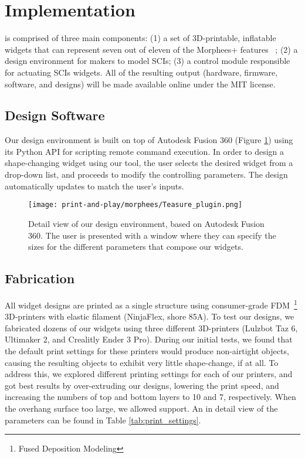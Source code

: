   \section{Implementation}
    \mp is comprised of three main components: (1) a set of 3D-printable,
    inflatable widgets that can represent seven out of eleven of the Morphees+
    features ~\cite{10.1145/3173574.3174193}; (2) a design environment for
    makers to model SCIs; (3) a control module responsible for actuating SCIs
    widgets. All of the resulting output (hardware, firmware, software, and
    designs) will be made available online under the MIT license.

    \subsection{Design Software}
      Our design environment is built on top of Autodesk Fusion 360 (Figure
      \ref{fig:plugin}) using its Python API for scripting remote command
      execution. In order to design a shape-changing widget using our tool, the
      user selects the desired widget from a drop-down list, and proceeds to
      modify the controlling parameters. The design automatically updates to
      match the user's inputs.
      
      \begin{figure}[htb]
        \centering
        \texttt{[image: print-and-play/morphees/Teasure\_plugin.png]}
        \caption{Detail view of our design environment, based on Autodesk Fusion
          360. The user is presented with a window where they can specify the
          sizes for the different parameters that compose our widgets.}
        \label{fig:plugin}
      \end{figure}

    \subsection{Fabrication}
      All \mp widget designs are printed as a single structure using
      consumer-grade FDM~\footnote{Fused Deposition Modeling} 3D-printers with
      elastic filament (NinjaFlex, shore 85A). To test our designs, we
      fabricated dozens of our widgets using three different 3D-printers
      (Lulzbot Taz 6, Ultimaker 2, and Crealitly Ender 3 Pro). During our
      initial tests, we found that the default print settings for these printers
      would produce non-airtight objects, causing the resulting objects to
      exhibit very little shape-change, if at all. To address this, we explored
      different printing settings for each of our printers, and got best results
      by over-extruding our designs, lowering the print speed, and increasing
      the numbers of top and bottom layers to 10 and 7, respectively. When the
      overhang surface too large, we allowed support. An in detail view of the
      parameters can be found in Table \ref{tab:print_settings}.

